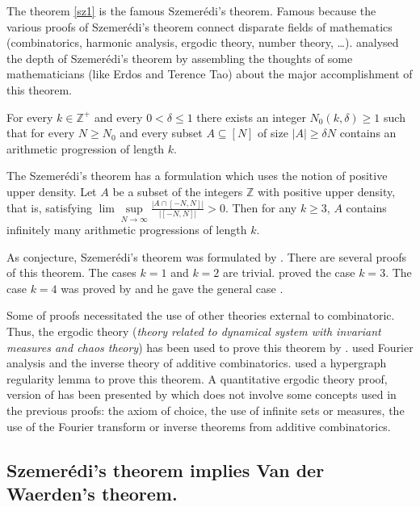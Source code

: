 The  theorem \eqref{sz1} is the famous Szemerédi’s theorem. Famous because the various proofs of Szemerédi's theorem connect disparate fields of mathematics (combinatorics, harmonic analysis, ergodic theory,  number theory, \ldots). \cite{arana2015depth} analysed the depth of Szemerédi's theorem by 
assembling the thoughts of some mathematicians (like Erdos and Terence Tao) about the major accomplishment of this theorem.

\begin{thm}	For every  $k \in \mathbb{Z}^+$ and every $0< \delta \leq  1$ there exists an integer $N_0(k,\delta) \geq 1$ such that for every $N \geq N_0$ and every subset $A \subseteq [N]$ of size $|A|\geq \delta N$ contains an arithmetic progression of length $k.$  \label{sz1} \end{thm}

The Szemerédi's theorem has a formulation which uses the notion of positive upper density. Let $A$ be a subset of the integers $\mathbb{Z}$ with positive upper density, that is, satisfying $\lim \sup\limits_{N\rightarrow \infty} \frac{|A \cap[-N,N]|}{|[-N,N]|} > 0.$ Then for any $k \geq  3$, $A$ contains infinitely many arithmetic progressions of length $k.$

As conjecture, Szemerédi's theorem was formulated by \cite{JLMS}. There are several proofs of this theorem. The cases $k=1$ and $k=2$ are trivial. \cite{roth1953certain, roth1970irregularities} proved the case $k=3.$ The case $k=4$ was proved by \cite{szemeredi1969sets} and he gave the general case \citep{szemeredi1975sets}.

Some of proofs necessitated the use of other theories external to combinatoric. Thus, the ergodic theory (\textit{theory related to dynamical system with invariant measures and chaos theory})  has been used to prove this theorem by \cite{furstenberg1977ergodic, furstenberg1982ergodic}. \cite{gowers1998fourier, gowers2001new}  used Fourier analysis and the inverse theory of additive  combinatorics. \cite{gowers2007hypergraph} used a hypergraph regularity lemma to prove this theorem. A  quantitative ergodic theory proof, version of \cite{furstenberg1982ergodic} has been presented  by \cite{tao2006quantitative} which does not involve some concepts used in the previous proofs: the axiom of choice, the use of infinite sets or measures, the use of the Fourier transform or inverse theorems from additive combinatorics.

\subsection{Szemerédi's theorem implies Van der Waerden's theorem.} \label{vsz}

